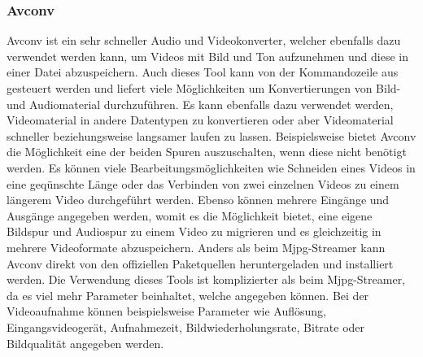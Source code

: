 \subsubsection{Avconv}
Avconv ist ein sehr schneller Audio und Videokonverter, welcher ebenfalls dazu verwendet werden kann, um Videos mit Bild und Ton aufzunehmen und diese in einer Datei abzuspeichern. Auch dieses Tool kann von der Kommandozeile aus gesteuert werden und liefert viele Möglichkeiten um Konvertierungen von Bild- und Audiomaterial durchzuführen. Es kann ebenfalls dazu verwendet werden, Videomaterial in andere Datentypen zu konvertieren oder aber Videomaterial schneller beziehungsweise langsamer laufen zu lassen. Beispielsweise bietet Avconv die Möglichkeit eine der beiden Spuren auszuschalten, wenn diese nicht benötigt werden. Es können viele Bearbeitungsmöglichkeiten wie Schneiden eines Videos in eine geqünschte Länge oder das Verbinden von zwei einzelnen Videos zu einem längerem Video durchgeführt werden. Ebenso können mehrere Eingänge und Ausgänge angegeben werden, womit es die Möglichkeit bietet, eine eigene Bildspur und Audiospur zu einem Video zu migrieren und es gleichzeitig in mehrere Videoformate abzuspeichern. Anders als beim Mjpg-Streamer kann Avconv direkt von den offiziellen Paketquellen heruntergeladen und installiert werden. Die Verwendung dieses Tools ist komplizierter als beim Mjpg-Streamer, da es viel mehr Parameter beinhaltet, welche angegeben können. Bei der Videoaufnahme können beispielsweise Parameter wie Auflösung, Eingangsvideogerät, Aufnahmezeit, Bildwiederholungsrate, Bitrate oder Bildqualität angegeben werden. \cite{Avconv}

